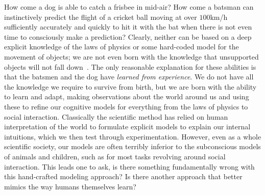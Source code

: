 
How come a dog is able to catch a
frisbee in mid-air? How come a batsman can instinctively predict the flight of a cricket ball
moving at over $100$km/h sufficiently accurately and quickly to hit it with the bat when there
is not even time to consciously make a prediction?  Clearly, neither can be based on a
deep explicit knowledge of the laws of physics or some hard-coded model for the movement
of objects; we are not even born with the knowledge that unsupported objects will not 
fall down~\citep{baillargeon2002acquisition}.  The only reasonable explanation for these
abilities is that the batsmen and the dog have \emph{learned from experience}.  We do not have
all the knowledge we require to survive from birth, but we are born with the
ability to learn and adapt, making observations about the world around us and using these
to refine our cognitive models for everything from the laws of physics to social interaction.
Classically the scientific method has relied on human interpretation of the world to formulate
explicit models to explain our internal intuitions, which we then test
through experimentation.  However, even as a whole scientific society, our models
are often terribly inferior to the subconscious models of animals and children, such as for most
tasks revolving around social interaction.  This leads one to ask, is there something fundamentally
wrong with this hand-crafted modeling approach?  Is there another approach that better mimics the
way humans themselves learn?

